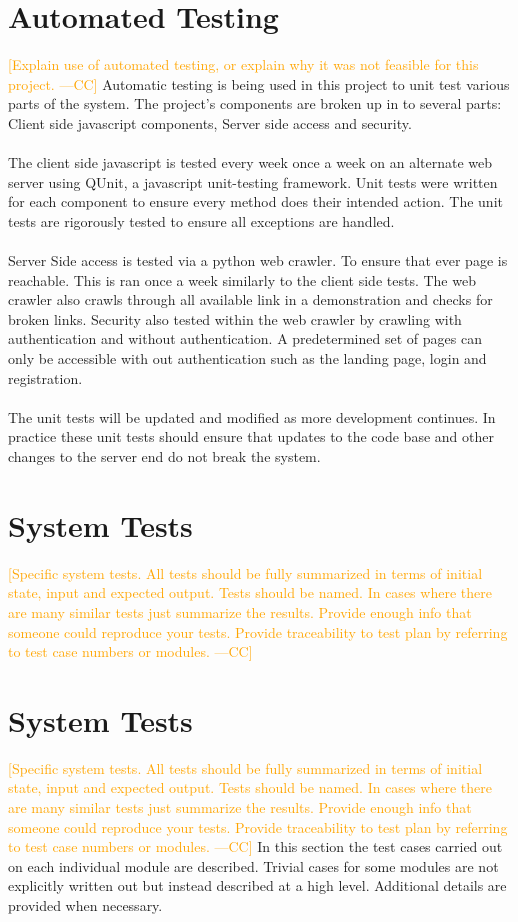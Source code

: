 \documentclass[12pt]{article}
\newcommand{\authornote}[3]{\textcolor{#1}{[#3 ---#2]}}
\newcommand{\authornote}[3]{}
\newcommand{\cc}[1]{\authornote{orange}{CC}{#1}}
\begin{document}
\section{Automated Testing}
\cc{Explain use of automated testing, or explain why it was not feasible for this project.}
Automatic testing is being used in this project to unit test various parts of the system. The project's components are broken up in to several parts: Client side javascript components, Server side access and security.
\\ \\
The client side javascript is tested every week once a week on an alternate web server using QUnit, a javascript unit-testing framework. Unit tests were written for each component to ensure every method does their intended action. The unit tests are rigorously tested to ensure all exceptions are handled.
\\ \\
Server Side access is tested via a python web crawler. To ensure that ever page is reachable. This is ran once a week similarly to the client side tests. The web crawler also crawls through all available link in a demonstration and checks for broken links. Security also tested within the web crawler by crawling with authentication and without authentication. A predetermined set of pages can only be accessible with out authentication such as the landing page, login and registration.
\\ \\
The unit tests will be updated and modified as more development continues. In practice these unit tests should ensure that updates to the code base and other changes to the server end do not break the system.
\section{System Tests}
\cc{Specific system tests.  All tests should be fully summarized in terms of initial state, input and expected output. Tests should be named. In cases where there are many similar tests just summarize the results. Provide enough info that someone could reproduce your tests. Provide traceability to test plan by referring to test case numbers or modules.}

\section{System Tests}
\cc{Specific system tests.  All tests should be fully summarized in terms of initial state, input and expected output. Tests should be named. In cases where there are many similar tests just summarize the results. Provide enough info that someone could reproduce your tests. Provide traceability to test plan by referring to test case numbers or modules.} In this section the test cases carried out on each individual module are described. Trivial cases for some modules are not explicitly written out but instead described at a high level. Additional details are provided when necessary.
\end{document}
